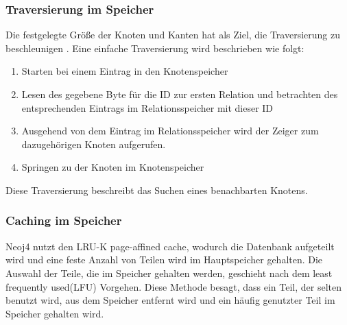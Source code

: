 \subsubsection {Traversierung im Speicher}
Die festgelegte Größe der Knoten und Kanten hat als Ziel, die Traversierung zu beschleunigen \parencite{robinson2013graph}. Eine einfache Traversierung wird beschrieben wie folgt: 
\begin{enumerate}
	\item Starten bei einem Eintrag in den Knotenspeicher
	\item Lesen des gegebene Byte für die ID zur ersten Relation und betrachten des entsprechenden Eintrags im Relationsspeicher mit dieser ID
	\item Ausgehend von dem Eintrag im Relationsspeicher wird der Zeiger zum dazugehörigen Knoten aufgerufen.
	\item Springen zu der Knoten im Knotenspeicher
\end{enumerate}
Diese Traversierung beschreibt das Suchen eines benachbarten Knotens.
\subsubsection{Caching im Speicher}
Neoj4 nutzt den LRU-K page-affined cache, wodurch die Datenbank aufgeteilt wird und eine feste Anzahl von Teilen wird im Hauptspeicher gehalten. Die Auswahl der Teile, die im Speicher gehalten werden, geschieht nach dem least frequently used(LFU) Vorgehen. Diese Methode besagt, dass ein Teil, der selten benutzt wird, aus dem Speicher entfernt wird und ein häufig genutzter Teil im Speicher gehalten wird\parencite{robinson2013graph}.
